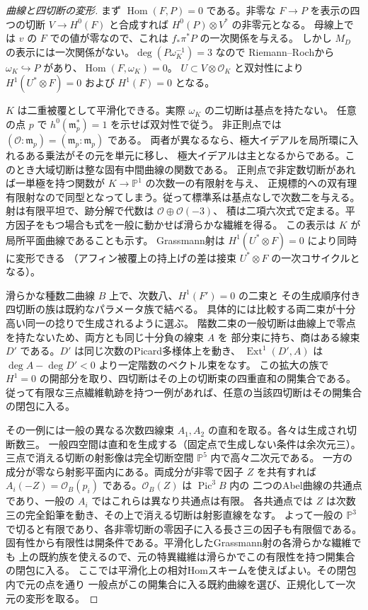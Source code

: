 \begin{proof}[曲線と四切断の変形]
まず $\operatorname{Hom}(F,P)=0$ である。非零な $F\to P$ を表示の四つの切断
$V\to H^0(F)$ と合成すれば $H^0(P)\otimes V^*$ の非零元となる。
母線上では $v$ の $F$ での値が零なので、これは $f_*\pi^*P$ の一次関係を与える。
しかし $M_D$ の表示には一次関係がない。$\deg(P\omega_K^{-1})=3$ なので
Riemann--Rochから $\omega_K\hookrightarrow P$ があり、$\operatorname{Hom}(F,\omega_K)=0$。
$U\subset V\otimes\mathcal O_K$ と双対性により $H^1(U^*\otimes F)=0$ および $H^1(F)=0$ となる。

$K$ は二重被覆として平滑化できる。実際 $\omega_K$ の二切断は基点を持たない。
任意の点 $p$ で $h^0(\mathfrak m_p^*)=1$ を示せば双対性で従う。
非正則点では $(\mathcal O:\mathfrak m_p)=(\mathfrak m_p:\mathfrak m_p)$ である。
両者が異なるなら、極大イデアルを局所環に入れるある乗法がその元を単元に移し、
極大イデアルは主となるからである。このとき大域切断は整な固有中間曲線の関数である。
正則点で非定数切断があれば一単極を持つ関数が $K\to\mathbb P^1$ の次数一の有限射を与え、
正規標的への双有理有限射なので同型となってしまう。従って標準系は基点なしで次数二を与える。
射は有限平坦で、跡分解で代数は $\mathcal O\oplus\mathcal O(-3)$、
積は二項六次式で定まる。平方因子をもつ場合も式を一般に動かせば滑らかな繊維を得る。
この表示は $K$ が局所平面曲線であることも示す。
Grassmann射は $H^1(U^*\otimes F)=0$ により同時に変形できる
（アフィン被覆上の持上げの差は接束 $U^*\otimes F$ の一次コサイクルとなる）。

滑らかな種数二曲線 $B$ 上で、次数八、$H^1(F')=0$ の二束と
その生成順序付き四切断の族は既約なパラメータ族で結べる。
具体的には比較する両二束が十分高い同一の捻りで生成されるように選ぶ。
階数二束の一般切断は曲線上で零点を持たないため、両方とも同じ十分負の線束 $A$ を
部分束に持ち、商はある線束 $D'$ である。$D'$ は同じ次数のPicard多様体上を動き、
$\operatorname{Ext}^1(D',A)$ は $\deg A-\deg D'<0$ より一定階数のベクトル束をなす。
この拡大の族で $H^1=0$ の開部分を取り、四切断はその上の切断束の四重直和の開集合である。
従って有限な三点繊維軌跡を持つ一例があれば、任意の当該四切断はその開集合の閉包に入る。

その一例には一般の異なる次数四線束 $A_1,A_2$ の直和を取る。各々は生成され切断数三。
一般四空間は直和を生成する（固定点で生成しない条件は余次元三）。
三点で消える切断の射影像は完全切断空間 $\mathbb P^5$ 内で高々二次元である。
一方の成分が零なら射影平面内にある。両成分が非零で因子 $Z$ を共有すれば
$A_i(-Z)=\mathcal O_B(p_i)$ である。$\mathcal O_B(Z)$ は $\operatorname{Pic}^3 B$ 内の
二つのAbel曲線の共通点であり、一般の $A_i$ ではこれらは異なり共通点は有限。
各共通点では $Z$ は次数三の完全鉛筆を動き、その上で消える切断は射影直線をなす。
よって一般の $\mathbb P^3$ で切ると有限であり、各非零切断の零因子に入る長さ三の因子も有限個である。
固有性から有限性は開条件である。平滑化したGrassmann射の各滑らかな繊維でも
上の既約族を使えるので、元の特異繊維は滑らかでこの有限性を持つ開集合の閉包に入る。
ここでは平滑化上の相対Homスキームを使えばよい。その閉包内で元の点を通り
一般点がこの開集合に入る既約曲線を選び、正規化して一次元の変形を取る。
\end{proof}

